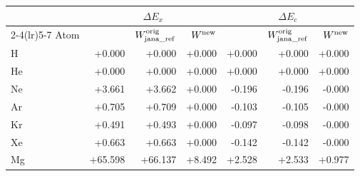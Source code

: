 \begin{tabular}{@{}l rrr rrr@{}}
\toprule
 & \multicolumn{3}{c}{$\Delta E_x$} & \multicolumn{3}{c}{$\Delta E_c$} \\
\cmidrule(lr){2-4}\cmidrule(lr){5-7}
Atom & \janaref{} & $W^{\rm orig}_{\rm jana\_ref}$ & $W^{\rm new}$ & \janaref{} & $W^{\rm orig}_{\rm jana\_ref}$ & $W^{\rm new}$ \\
\midrule
H & +0.000 & \textcolor{pyscfred}{+0.000} & \textcolor{pyscfred}{+0.000} & +0.000 & \textcolor{pyscfred}{+0.000} & \textcolor{pyscfred}{+0.000} \\
He & +0.000 & \textcolor{pyscfred}{+0.000} & \textcolor{pyscfred}{+0.000} & +0.000 & \textcolor{pyscfred}{+0.000} & \textcolor{pyscfred}{+0.000} \\
Ne & +3.661 & \textcolor{pyscfred}{+3.662} & \textcolor{pyscfred}{+0.000} & -0.196 & \textcolor{pyscfred}{-0.196} & \textcolor{pyscfred}{-0.000} \\
Ar & +0.705 & \textcolor{pyscfred}{+0.709} & \textcolor{pyscfred}{+0.000} & -0.103 & \textcolor{pyscfred}{-0.105} & \textcolor{pyscfred}{-0.000} \\
Kr & +0.491 & \textcolor{pyscfred}{+0.493} & \textcolor{pyscfred}{+0.000} & -0.097 & \textcolor{pyscfred}{-0.098} & \textcolor{pyscfred}{-0.000} \\
Xe & +0.663 & \textcolor{pyscfred}{+0.663} & \textcolor{pyscfred}{+0.000} & -0.142 & \textcolor{pyscfred}{-0.142} & \textcolor{pyscfred}{-0.000} \\
Mg & +65.598 & \textcolor{pyscfred}{+66.137} & \textcolor{pyscfred}{+8.492} & +2.528 & \textcolor{pyscfred}{+2.533} & \textcolor{pyscfred}{+0.977} \\
\bottomrule
\end{tabular}
